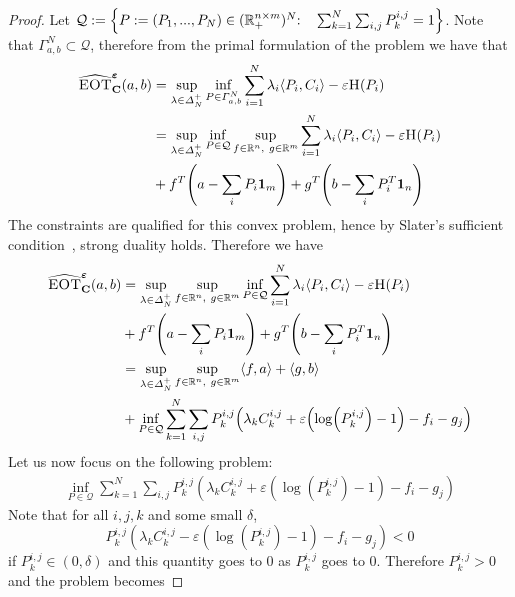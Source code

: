 \begin{proof}
Let $\mathcal{Q}:=\left\{P:=(P_1,...,P_N)\in(\mathbb{R}_{+}^{n\times m})^N \text{:\quad} \sum_{k=1}^N \sum_{i,j} P_k^{i,j}=1 \right\}$. Note that $\Gamma_{a,b}^N\subset \mathcal{Q}$, therefore from the primal formulation of the problem we have that 
\begin{align*}
    \widehat{\MOT}^{\bm{\varepsilon}}_{\mathbf{C}}(a,b)&=\sup_{\lambda\in\Delta_N^{+}}\inf_{P\in \Gamma_{a,b}^N}  \sum_{i=1}^N \lambda_i \langle P_i,C_i\rangle -\varepsilon \ent(P_i) \\
   &= \sup_{\lambda\in\Delta_N^{+}} \inf_{P\in\mathcal{Q}}  \sup_{f\in\mathbb{R}^n,~g\in\mathbb{R}^m} \sum_{i=1}^N \lambda_i \langle P_i,C_i\rangle -\varepsilon \ent(P_i)\\
   & +f^T\left(a-\sum_i P_i\mathbf{1}_m\right)+g^T\left(b-\sum_i P_i^T\mathbf{1}_n\right)\\
\end{align*}
The constraints are qualified for this convex problem, hence by Slater's sufficient condition~\citep[Section 5.2.3]{boyd2004convex}, strong duality holds. Therefore we have
\begin{align*}
    \widehat{\MOT}^{\bm{\varepsilon}}_{\mathbf{C}}(a,b)&=\sup_{\lambda\in\Delta_N^{+}}\sup_{f\in\mathbb{R}^n,~g\in\mathbb{R}^m} \inf_{P\in \mathcal{Q}} \sum_{i=1}^N \lambda_i \langle P_i,C_i\rangle -\varepsilon \ent(P_i) \\
    &+ f^T\left(a-\sum_i P_i\mathbf{1}_m\right)+g^T\left(b-\sum_i P_i^T\mathbf{1}_n\right)\\
   &= \sup_{\lambda\in\Delta_N^{+}} \sup_{f\in\mathbb{R}^n,~g\in\mathbb{R}^m} \langle f,a \rangle + \langle g, b \rangle \\
   &+ \inf_{P\in\mathcal{Q}}
   \sum_{k=1}^N \sum_{i,j} P_k^{i,j} \left(\lambda_k C_k^{i,j} +\varepsilon\left(\log(P_k^{i,j})-1\right) -f_i - g_j \right)  \\
\end{align*}
Let us now focus on the following problem:
\begin{align*}
\inf_{P\in\mathcal{Q}}
   \sum_{k=1}^N \sum_{i,j} P_k^{i,j} \left(\lambda_k C_k^{i,j} +\varepsilon\left(\log(P_k^{i,j})-1\right) -f_i - g_j \right)
\end{align*}
Note that for all $i, j,k$ and some small $\delta$,
$$ P_k^{i,j}\left(\lambda_k C_k^{i,j} -\varepsilon\left(\log(P_k^{i,j})-1\right) -f_i - g_j \right)<0$$
if $P_k^{i,j}\in(0,\delta)$ and this quantity goes to 0 as $P_k^{i,j}$ goes to 0. Therefore $P_k^{i,j}>0$ and the problem becomes

\end{proof}
